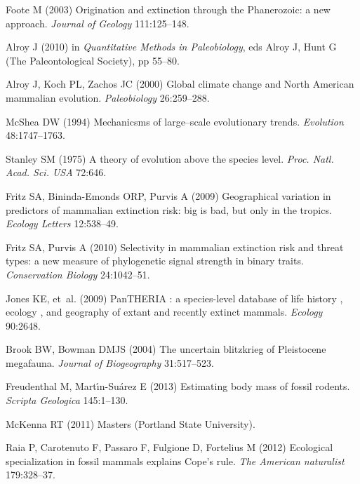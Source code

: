 \documentclass{pnastwo}
\begin{document}
\begin{article}
\begin{thebibliography}{10}
Foote M
\newblock (2003) {Origination and extinction through the Phanerozoic: a new
  approach}.
\newblock \emph{Journal of Geology} 111:125--148.

Alroy J
\newblock (2010) in \emph{Quantitative Methods in Paleobiology}, eds{} Alroy J,
  Hunt G
\newblock (The Paleontological Society), pp 55--80.

Alroy J, Koch PL, Zachos JC
\newblock (2000) {Global climate change and North American mammalian
  evolution}.
\newblock \emph{Paleobiology} 26:259--288.

McShea DW
\newblock (1994) {Mechanicsms of large--scale evolutionary trends}.
\newblock \emph{Evolution} 48:1747--1763.

Stanley SM
\newblock (1975) {A theory of evolution above the species level}.
\newblock \emph{Proc. Natl. Acad. Sci. USA} 72:646.

Fritz SA, Bininda-Emonds ORP, Purvis A
\newblock (2009) {Geographical variation in predictors of mammalian extinction
  risk: big is bad, but only in the tropics.}
\newblock \emph{Ecology Letters} 12:538--49.

Fritz SA, Purvis A
\newblock (2010) {Selectivity in mammalian extinction risk and threat types: a
  new measure of phylogenetic signal strength in binary traits.}
\newblock \emph{Conservation Biology} 24:1042--51.

Jones KE, {et~al.}
\newblock (2009) {PanTHERIA : a species-level database of life history ,
  ecology , and geography of extant and recently extinct mammals}.
\newblock \emph{Ecology} 90:2648.

Brook BW, Bowman DMJS
\newblock (2004) {The uncertain blitzkrieg of Pleistocene megafauna}.
\newblock \emph{Journal of Biogeography} 31:517--523.

Freudenthal M, Mart\'{\i}n-Su\'{a}rez E
\newblock (2013) {Estimating body mass of fossil rodents}.
\newblock \emph{Scripta Geologica} 145:1--130.

McKenna RT
\newblock (2011) Masters (Portland State University).

Raia P, Carotenuto F, Passaro F, Fulgione D, Fortelius M
\newblock (2012) {Ecological specialization in fossil mammals explains Cope's
  rule.}
\newblock \emph{The American naturalist} 179:328--37.


\end{thebibliography}
\end{article}
\end{document}
